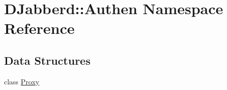 \hypertarget{namespace_d_jabberd_1_1_authen}{
\section{\-D\-Jabberd\-:\-:\-Authen \-Namespace \-Reference}
\label{namespace_d_jabberd_1_1_authen}
}
\subsection*{\-Data \-Structures}
\begin{DoxyCompactItemize}
\item 
class \hyperlink{class_d_jabberd_1_1_authen_1_1_proxy}{\-Proxy}
\end{DoxyCompactItemize}
